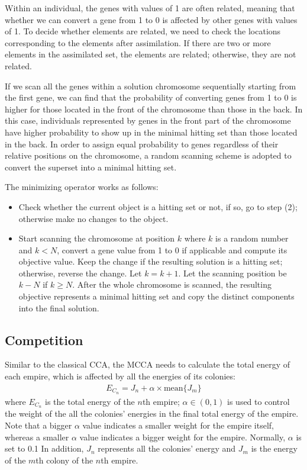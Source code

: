 Within an individual, the genes with values of 1 are often related, meaning that whether we can convert a gene from 1 to 0 is affected by other genes with values of 1.
To decide whether elements are related, we need to check the locations corresponding to the elements after assimilation.
If there are two or more elements in the assimilated set, the elements are related; otherwise, they are not related.

If we scan all the genes within a solution chromosome sequentially starting from the first gene, we can find that the probability of converting genes from 1 to 0 is higher for those located in the front of the chromosome than those in the back.
In this case, individuals represented by genes in the front part of the chromosome have higher probability to show up in the minimal hitting set than those located in the back.
In order to assign equal probability to genes regardless of their relative positions on the chromosome, a random scanning scheme is adopted to convert the superset into a minimal hitting set.

The minimizing operator works as follows:
\begin{itemize}
	\item Check whether the current object is  a hitting set or not, if so, go to step (2); otherwise make no changes to the object.
	\item Start scanning the chromosome at position $k$ where $k$ is a random number and $k < N$, convert a gene value from 1 to 0 if applicable and compute its objective value. Keep the change if the resulting solution is a hitting set; otherwise, reverse the change. Let $k = k + 1$. Let the scanning position be $k - N$ if $k \geq N$. After the whole chromosome is scanned, the resulting objective represents a minimal hitting set and copy the distinct components into the final solution.
\end{itemize}


\subsection{Competition}
Similar to the classical CCA, the MCCA needs to calculate the total energy of each empire, which is affected by all the energies of its colonies:
\begin{align}
	E_{C_n} = J_n + \alpha \times \text{mean}\{J_m\}
\end{align}
where $E_{C_n}$ is the total energy of the $n$th empire; $\alpha \in (0, 1)$ is used to control the weight of the all the colonies' energies in the final total energy of the empire.
Note that a bigger $\alpha$ value indicates a smaller weight for the empire itself, whereas a smaller $\alpha$ value indicates a bigger weight for the empire.
Normally, $\alpha$ is set to 0.1
In addition, $J_n$ represents all the colonies' energy and $J_m$ is the energy of the $m$th colony of the $n$th empire.

